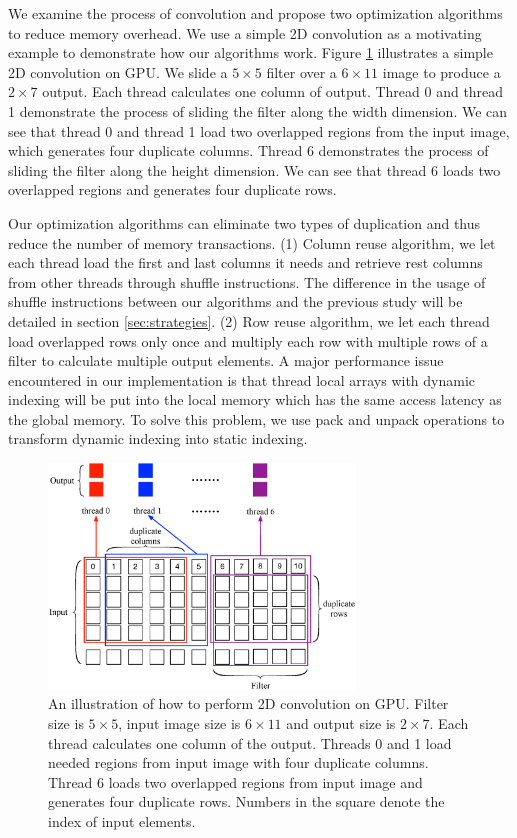 We examine the process of convolution and propose two optimization algorithms to reduce memory overhead. We use a simple 2D convolution as
a motivating example to demonstrate how our algorithms work. Figure \ref{fig:twostrategies} illustrates a simple 2D convolution on GPU. We
slide a $5 \times 5$ filter over a $6 \times 11$ image to produce a $2 \times 7$ output. Each thread calculates one column of output.
Thread 0 and thread 1 demonstrate the process of sliding the filter along the width dimension. We can see that thread 0 and thread 1 load
two overlapped regions from the input image, which generates four duplicate columns. Thread 6 demonstrates the process of sliding the
filter along the height dimension. We can see that thread 6 loads two overlapped regions and generates four duplicate rows.

Our optimization algorithms can eliminate two types of duplication and thus reduce the number of memory transactions. (1) Column reuse
algorithm, we let each thread load the first and last columns it needs and retrieve rest columns from other threads through shuffle
instructions. The difference in the usage of shuffle instructions between our algorithms and the previous study
\cite{vasilache2014fast} will be detailed in section \ref{sec:strategies}. (2) Row reuse algorithm, we let each thread load overlapped
rows only once and multiply each row with multiple rows of a filter to calculate multiple output elements. A major performance issue
encountered in our implementation is that thread local arrays with dynamic indexing will be put into the local memory which has the same
access latency as the global memory. To solve this problem, we use pack and unpack operations to transform dynamic indexing into static indexing.

\begin{figure}
\centering
  \includegraphics[width=\columnwidth,height=6cm]{./figure/twostrategies.eps}
  \caption{An illustration of how to perform 2D convolution on GPU. Filter size is $5 \times 5$, input image size is $6 \times 11$ and output size is $2 \times 7$. Each thread calculates one column of the output. Threads 0 and 1 load needed regions from input image with four duplicate columns. Thread 6 loads two overlapped regions from input image and generates four duplicate rows. Numbers in the square denote the index of input elements.}
  \label{fig:twostrategies}
\end{figure}
